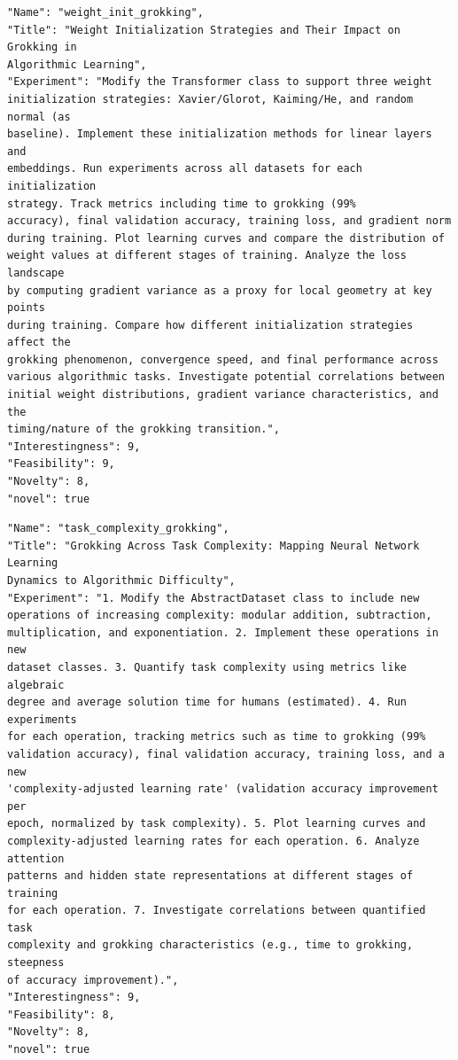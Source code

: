 \begin{tcolorbox}[breakable,colback=blue!5!white, colframe=blue!75!black, title=Idea 9/50 - \texttt{weight\_init\_grokking}]
\small
\begin{verbatim}
"Name": "weight_init_grokking",
"Title": "Weight Initialization Strategies and Their Impact on Grokking in
Algorithmic Learning",
"Experiment": "Modify the Transformer class to support three weight
initialization strategies: Xavier/Glorot, Kaiming/He, and random normal (as
baseline). Implement these initialization methods for linear layers and
embeddings. Run experiments across all datasets for each initialization
strategy. Track metrics including time to grokking (99%
accuracy), final validation accuracy, training loss, and gradient norm
during training. Plot learning curves and compare the distribution of
weight values at different stages of training. Analyze the loss landscape
by computing gradient variance as a proxy for local geometry at key points
during training. Compare how different initialization strategies affect the
grokking phenomenon, convergence speed, and final performance across
various algorithmic tasks. Investigate potential correlations between
initial weight distributions, gradient variance characteristics, and the
timing/nature of the grokking transition.",
"Interestingness": 9,
"Feasibility": 9,
"Novelty": 8,
"novel": true
\end{verbatim}
\end{tcolorbox}

\begin{tcolorbox}[breakable,colback=blue!5!white, colframe=blue!75!black, title=Idea 10/50 - \texttt{task\_complexity\_grokking}]
\small
\begin{verbatim}
"Name": "task_complexity_grokking",
"Title": "Grokking Across Task Complexity: Mapping Neural Network Learning
Dynamics to Algorithmic Difficulty",
"Experiment": "1. Modify the AbstractDataset class to include new
operations of increasing complexity: modular addition, subtraction,
multiplication, and exponentiation. 2. Implement these operations in new
dataset classes. 3. Quantify task complexity using metrics like algebraic
degree and average solution time for humans (estimated). 4. Run experiments
for each operation, tracking metrics such as time to grokking (99%
validation accuracy), final validation accuracy, training loss, and a new
'complexity-adjusted learning rate' (validation accuracy improvement per
epoch, normalized by task complexity). 5. Plot learning curves and
complexity-adjusted learning rates for each operation. 6. Analyze attention
patterns and hidden state representations at different stages of training
for each operation. 7. Investigate correlations between quantified task
complexity and grokking characteristics (e.g., time to grokking, steepness
of accuracy improvement).",
"Interestingness": 9,
"Feasibility": 8,
"Novelty": 8,
"novel": true
\end{verbatim}
\end{tcolorbox}

